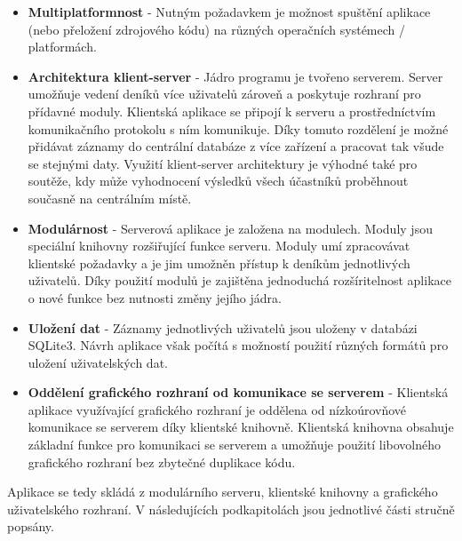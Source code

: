 \begin{itemize}
\item \textbf{Multiplatformnost} - Nutným požadavkem je možnost spuštění
aplikace (nebo přeložení zdrojového kódu) na různých operačních systémech / platformách.
\item \textbf{Architektura klient-server} - Jádro programu je tvořeno serverem.
Server umožňuje vedení deníků více uživatelů zároveň a poskytuje rozhraní pro přídavné moduly.
Klientská aplikace se připojí k serveru a prostředníctvím komunikačního protokolu s ním komunikuje.
Díky tomuto rozdělení je možné přidávat záznamy do centrální databáze z více zařízení a pracovat
tak všude se stejnými daty. Využití klient-server architektury je výhodné také pro soutěže, kdy může vyhodnocení
výsledků všech účastníků proběhnout současně na centrálním místě.
\item \textbf{Modulárnost} - Serverová aplikace je založena na modulech. Moduly jsou speciální knihovny rozšiřující funkce
serveru. Moduly umí zpracovávat klientské požadavky a je jim umožněn přístup k deníkům jednotlivých uživatelů. Díky použití modulů
je zajištěna jednoduchá rozšíritelnost aplikace o nové funkce bez nutnosti změny jejího jádra.
\item \textbf{Uložení dat} - Záznamy jednotlivých uživatelů jsou uloženy v databázi SQLite3. Návrh aplikace
však počítá s možností použití různých formátů pro uložení uživatelských dat.
\item \textbf{Oddělení grafického rozhraní od komunikace se serverem} - Klientská aplikace využívající grafického rozhraní
je oddělena od nízkoúrovňové komunikace se serverem díky klientské knihovně. Klientská knihovna obsahuje základní funkce
pro komunikaci se serverem a umožňuje použití libovolného grafického rozhraní bez zbytečné duplikace kódu.
\end{itemize}

Aplikace se tedy skládá z modulárního serveru, klientské knihovny a grafického uživatelského rozhraní.
V následujících podkapitolách jsou jednotlivé části stručně popsány.

